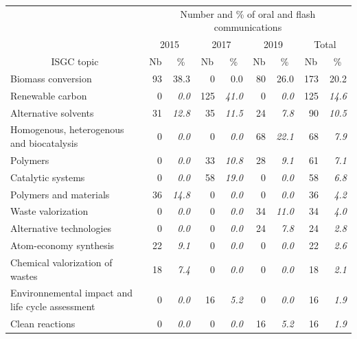 \documentclass[
]{article}
\begin{document}
\begin{table}
\centering
\begin{tabular}[t]{l|r|>{}r|r|>{}r|r|>{}r|r|>{}r}
\hline
\multicolumn{1}{c|}{ } & \multicolumn{8}{c}{Number and \% of oral and flash communications} \\
\cline{2-9}
\multicolumn{1}{c|}{ } & \multicolumn{2}{c|}{2015} & \multicolumn{2}{c|}{2017} & \multicolumn{2}{c|}{2019} & \multicolumn{2}{c}{Total} \\
\cline{2-3} \cline{4-5} \cline{6-7} \cline{8-9}
\multicolumn{1}{c|}{ISGC topic} & \multicolumn{1}{c|}{Nb} & \multicolumn{1}{c|}{\%} & \multicolumn{1}{c|}{Nb} & \multicolumn{1}{c|}{\%} & \multicolumn{1}{c|}{Nb} & \multicolumn{1}{c|}{\%} & \multicolumn{1}{c|}{Nb} & \multicolumn{1}{c}{\%} \\
\cline{1-1} \cline{2-2} \cline{3-3} \cline{4-4} \cline{5-5} \cline{6-6} \cline{7-7} \cline{8-8} \cline{9-9}
Biomass conversion & 93 & 38.3 & 0 & 0.0 & 80 & 26.0 & 173 & 20.2\\
\hline
Renewable carbon & 0 & \em{0.0} & 125 & \em{41.0} & 0 & \em{0.0} & 125 & \em{14.6}\\
\hline
Alternative solvents & 31 & \em{12.8} & 35 & \em{11.5} & 24 & \em{7.8} & 90 & \em{10.5}\\
\hline
Homogenous, heterogenous and biocatalysis & 0 & \em{0.0} & 0 & \em{0.0} & 68 & \em{22.1} & 68 & \em{7.9}\\
\hline
Polymers & 0 & \em{0.0} & 33 & \em{10.8} & 28 & \em{9.1} & 61 & \em{7.1}\\
\hline
Catalytic systems & 0 & \em{0.0} & 58 & \em{19.0} & 0 & \em{0.0} & 58 & \em{6.8}\\
\hline
Polymers and materials & 36 & \em{14.8} & 0 & \em{0.0} & 0 & \em{0.0} & 36 & \em{4.2}\\
\hline
Waste valorization & 0 & \em{0.0} & 0 & \em{0.0} & 34 & \em{11.0} & 34 & \em{4.0}\\
\hline
Alternative technologies & 0 & \em{0.0} & 0 & \em{0.0} & 24 & \em{7.8} & 24 & \em{2.8}\\
\hline
Atom-economy synthesis & 22 & \em{9.1} & 0 & \em{0.0} & 0 & \em{0.0} & 22 & \em{2.6}\\
\hline
Chemical valorization of wastes & 18 & \em{7.4} & 0 & \em{0.0} & 0 & \em{0.0} & 18 & \em{2.1}\\
\hline
Environnemental impact and life cycle assessment & 0 & \em{0.0} & 16 & \em{5.2} & 0 & \em{0.0} & 16 & \em{1.9}\\
\hline
Clean reactions & 0 & \em{0.0} & 0 & \em{0.0} & 16 & \em{5.2} & 16 & \em{1.9}\\

\end{tabular}
\end{table}
\end{document}
